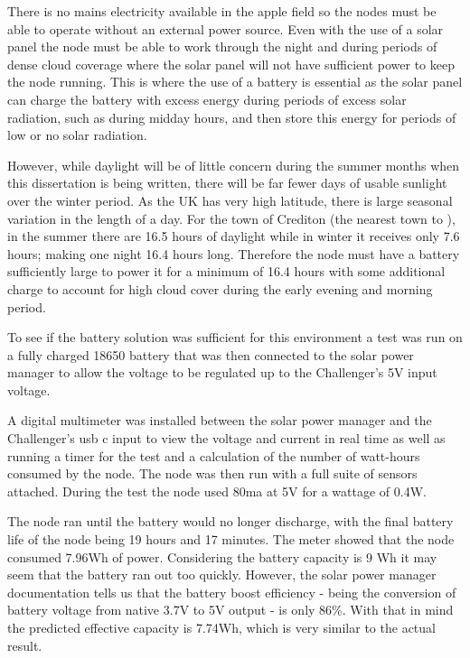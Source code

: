 There is no mains electricity available in the apple field so the nodes must be
able to operate without an external power source. Even with the use of a solar
panel the node must be able to work through the night and during periods of
dense cloud coverage where the solar panel will not have sufficient power to
keep the node running. This is where the use of a battery is essential as the
solar panel can charge the battery with excess energy during periods of excess
solar radiation, such as during midday hours, and then store this energy for
periods of low or no solar radiation.

However, while daylight will be of little concern during the summer months when
this dissertation is being written, there will be far fewer days of usable
sunlight over the winter period. As the UK has very high latitude, there is
large seasonal variation in the length of a day. For the town of Crediton (the
nearest town to \farmName), in the summer there are 16.5 hours of daylight while
in winter it receives only 7.6 hours; making one night 16.4 hours long.
Therefore the node must have a battery sufficiently large to power it for a
minimum of 16.4 hours with some additional charge to account for high cloud
cover during the early evening and morning period.

To see if the battery solution was sufficient for this environment a test was
run on a fully charged 18650 battery that was then connected to the solar power
manager to allow the voltage to be regulated up to the Challenger's 5V input
voltage.

A digital multimeter was installed between the solar power manager and the
Challenger's usb c input to view the voltage and current in real time as well as
running a timer for the test and a calculation of the number of watt-hours
consumed by the node. The node was then run with a full suite of sensors
attached. During the test the node used 80ma at 5V for a wattage of 0.4W.

The node ran until the battery would no longer discharge, with the final battery
life of the node being 19 hours and 17 minutes. The meter showed that the node
consumed 7.96Wh of power. Considering the battery capacity is 9 Wh it may seem
that the battery ran out too quickly. However, the solar power manager
documentation tells us that the battery boost efficiency - being the conversion
of battery voltage from native 3.7V to 5V output - is only 86\%. With that in
mind the predicted effective capacity is 7.74Wh, which is very similar to the
actual result.


